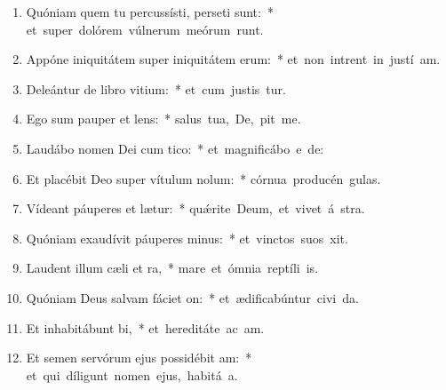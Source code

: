 \begin{flushleft}
\begin{enumerate}[leftmargin=*]
\item Quóniam quem tu percussísti, perseti sunt:~* \mbox{et super dolórem vúlnerum meórum runt.}
\item Appóne iniquitátem super iniquitátem erum:~* \mbox{et non intrent in justí am.}
\item Deleántur de libro vitium:~* \mbox{et cum justis  tur.}
\item Ego sum pauper et lens:~* \mbox{salus tua, De, pit me.}
\item Laudábo nomen Dei cum tico:~* \mbox{et magnificábo e  de:}
\item Et placébit Deo super vítulum nolum:~* \mbox{córnua producén  gulas.}
\item Vídeant páuperes et lætur:~* \mbox{qu\'{\ae}rite Deum, et vivet á stra.}
\item Quóniam exaudívit páuperes minus:~* \mbox{et vinctos suos  xit.}
\item Laudent illum cæli et ra,~* \mbox{mare et ómnia reptíli  is.}
\item Quóniam Deus salvam fáciet on:~* \mbox{et ædificabúntur civi da.}
\item Et inhabitábunt bi,~* \mbox{et hereditáte ac am.}
\item Et semen servórum ejus possidébit am:~* \mbox{et qui díligunt nomen ejus, habitá  a.}

\end{enumerate}
\end{flushleft}

